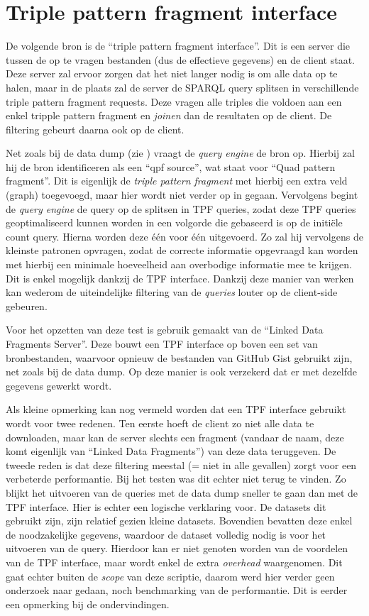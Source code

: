\section{Triple pattern fragment interface}
\label{sec:impl_tpf_interface}
De volgende bron is de ``triple pattern fragment interface''. Dit is een server die tussen de op te vragen bestanden (dus de effectieve gegevens) en de client staat. Deze server zal ervoor zorgen dat het niet langer nodig is om alle data op te halen, maar in de plaats zal de server de SPARQL query splitsen in verschillende triple pattern fragment requests. Deze vragen alle triples die voldoen aan een enkel tripple pattern fragment en \textit{joinen} dan de resultaten op de client. De filtering gebeurt daarna ook op de client.

Net zoals bij de data dump (zie ) vraagt de \textit{query engine} de bron op. Hierbij zal hij de bron identificeren als een ``qpf source'', wat staat voor ``Quad pattern fragment''. Dit is eigenlijk de \textit{triple pattern fragment} met hierbij een extra veld (graph) toegevoegd, maar hier wordt niet verder op in gegaan. Vervolgens begint de \textit{query engine} de query op de splitsen in TPF queries, zodat deze TPF queries geoptimaliseerd kunnen worden in een volgorde die gebaseerd is op de initiële count query. Hierna worden deze één voor één uitgevoerd. Zo zal hij vervolgens de kleinste patronen opvragen, zodat de correcte informatie opgevraagd kan worden met hierbij een minimale hoeveelheid aan overbodige informatie mee te krijgen. Dit is enkel mogelijk dankzij de TPF interface. Dankzij deze manier van werken kan wederom de uiteindelijke filtering van de \textit{queries} louter op de client-side gebeuren.

Voor het opzetten van deze test is gebruik gemaakt van de ``Linked Data Fragments Server''. Deze bouwt een TPF interface op boven een set van bronbestanden, waarvoor opnieuw de bestanden van GitHub Gist gebruikt zijn, net zoals bij de data dump. Op deze manier is ook verzekerd dat er met dezelfde gegevens gewerkt wordt. 

Als kleine opmerking kan nog vermeld worden dat een TPF interface gebruikt wordt voor twee redenen. Ten eerste hoeft de client zo niet alle data te downloaden, maar kan de server slechts een fragment (vandaar de naam, deze komt eigenlijk van ``Linked Data Fragments'') van deze data teruggeven. De tweede reden is dat deze filtering meestal (= niet in alle gevallen) zorgt voor een verbeterde performantie. Bij het testen was dit echter niet terug te vinden. Zo blijkt het uitvoeren van de queries met de data dump sneller te gaan dan met de TPF interface. Hier is echter een logische verklaring voor. De datasets dit gebruikt zijn, zijn relatief gezien kleine datasets. Bovendien bevatten deze enkel de noodzakelijke gegevens, waardoor de dataset volledig nodig is voor het uitvoeren van de query. Hierdoor kan er niet genoten worden van de voordelen van de TPF interface, maar wordt enkel de extra \textit{overhead} waargenomen. Dit gaat echter buiten de \textit{scope} van deze scriptie, daarom werd hier verder geen onderzoek naar gedaan, noch benchmarking van de performantie. Dit is eerder een opmerking bij de ondervindingen.
